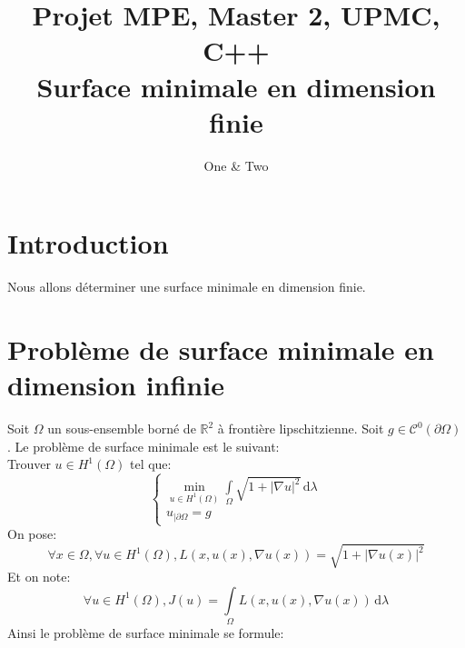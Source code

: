 \documentclass[a4paper, 11pt]{article}
\title{
Projet MPE, Master 2, UPMC, C++ \\
Surface minimale en dimension finie
}
\author{One \& Two}
\begin{document}
\maketitle
\newpage
\protect\hypertarget{table}{}
\renewcommand{\contentsname}{Sommaire}
\tableofcontents
\newpage
\newpage

\section{Introduction}
Nous allons d\'eterminer une surface minimale en dimension finie.

\section{Probl\`eme de surface minimale en dimension infinie}
Soit $\Omega$ un sous-ensemble born\'e de $\mathbb{R}^2$ \`a fronti\`ere
 lipschitzienne. Soit $g\in\mathcal{C}^0(\partial\Omega)$. Le probl\`eme de
 surface minimale est le suivant: \\

Trouver $u\in H^1(\Omega)$ tel que:
\begin{equation}
\begin{cases}
\min\limits_{u\in H^1(\Omega)}\int\limits_\Omega\sqrt{1+|\nabla u|^2}\,
\mathrm{d}\lambda \\
u_{|\partial\Omega}=g
\end{cases}
\end{equation}
On pose:
$$
\forall x\in\Omega, \forall u\in H^1(\Omega), L(x, u(x), \nabla u(x))=
\sqrt{1+|\nabla u(x)|^2}
$$
Et on note:
$$
\forall u\in H^1(\Omega), J(u)=\int\limits_\Omega L(x, u(x), \nabla u(x))
\,\mathrm{d}\lambda
$$
Ainsi le probl\`eme de surface minimale se formule: \\
\end{document}
